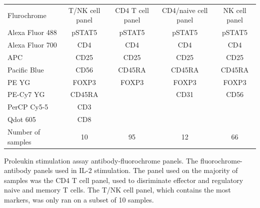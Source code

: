 \begin{table}[h!]\footnotesize
  \centering
\begin{tabularx}{\textwidth}{lcccc}
\rowcolor{Gray}
Flurochrome       & T/NK cell panel & CD4 T cell panel & CD4/naive cell panel & NK cell panel \\
Alexa Fluor 488   & pSTAT5          & pSTAT5           & pSTAT5               & pSTAT5  \\
Alexa Fluor 700   & CD4             & CD4              & CD4                  & CD4     \\
APC               & CD25            & CD25             & CD25                 & CD25    \\
Pacific Blue      & CD56            & CD45RA           & CD45RA               & CD45RA  \\
PE YG             & FOXP3           & FOXP3            & FOXP3                & FOXP3   \\
PE-Cy7 YG         & CD45RA          &                  & CD31                 & CD56    \\
PerCP Cy5-5       & CD3             &                  &                      & \\
Qdot 605          & CD8             &                  &                      & \\
\hline
Number of samples & 10              & 95               & 12                   & 66 \\
\end{tabularx}
{Proleukin stimulation assay antibody-fluorochrome panels.}
{
The fluorochrome-antibody panels used in IL-2 stimulation.
The panel used on the majority of samples was the CD4 T cell panel, used to disriminate
effector and regulatory naive and memory T cells.
The T/NK cell panel, which contains the most markers, was only ran on a subset of 10 samples.
}
\end{table}
%

